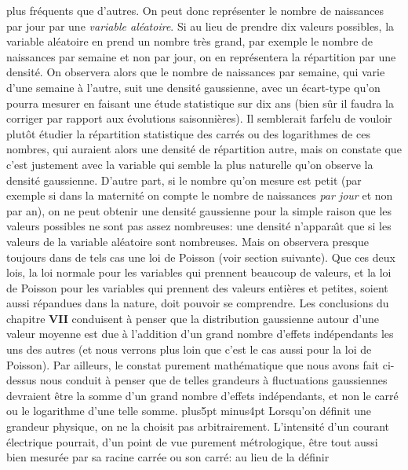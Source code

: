 plus fr\'equents que d'autres.  On peut donc repr\'esenter le nombre de 
naissances par jour par une {\it variable al\'eatoire}.  Si au lieu de 
prendre dix valeurs possibles,  la variable al\'eatoire en prend un 
nombre tr\`es grand,  par exemple le nombre de naissances par semaine  
et non par jour,  on en repr\'esentera la r\'epartition par une densit\'e.  
On observera alors que le nombre de naissances par semaine,  qui varie 
d'une semaine \`a l'autre,  suit une densit\'e gaussienne,  avec un 
\'ecart-type qu'on pourra mesurer en faisant une \'etude statistique sur 
dix ans (bien s\^ur il faudra la corriger par rapport aux \'evolutions 
saisonni\`eres).  Il semblerait farfelu de vouloir plut\^ot \'etudier
la r\'epartition statistique des carr\'es ou des logarithmes de 
ces nombres,  qui auraient alors une densit\'e de r\'epartition autre,  
mais on constate que c'est justement avec la variable qui semble la  
plus naturelle qu'on observe la densit\'e gaussienne.   
\medskip 
D'autre part,  si le nombre qu'on mesure est petit (par exemple si dans la  
maternit\'e on compte le nombre de naissances {\it par jour} et non par  
an),  on ne peut obtenir une densit\'e gaussienne pour la simple raison
que les valeurs possibles ne sont pas assez nombreuses:  une densit\'e  
n'appara{\^\i}t que si les valeurs de la variable al\'eatoire sont  
nombreuses.  Mais on observera presque toujours dans de tels cas une loi  
de Poisson (voir section suivante).  Que ces deux lois,  la loi normale pour  
les variables qui prennent beaucoup de valeurs,  et la loi de Poisson pour  
les variables qui prennent des valeurs enti\`eres et petites,  soient aussi  
r\'epandues dans la nature,  doit pouvoir se comprendre. 
\medskip 
Les conclusions du chapitre {\bf VII} conduisent \`a penser que la 
distribution gaussienne autour d'une valeur moyenne est due \`a  
l'addition d'un grand nombre d'effets ind\'ependants les uns des autres 
(et nous verrons plus loin que c'est le cas aussi pour la loi de Poisson).  
Par ailleurs,  le constat purement math\'ematique que nous avons fait 
ci-dessus nous conduit \`a penser que de telles grandeurs \`a fluctuations 
gaussiennes devraient \^etre la somme d'un grand nombre d'effets 
ind\'ependants,  et non le carr\'e ou le logarithme d'une telle somme.   
\vskip 6pt plus5pt minus4pt 
Lorsqu'on d\'efinit une grandeur physique,  on ne la choisit pas 
arbitrairement.  L'intensit\'e d'un courant \'electrique pourrait,  
d'un point de vue purement m\'etrologique,  \^etre tout aussi bien  
mesur\'ee par sa racine carr\'ee ou son carr\'e: au lieu de la d\'efinir 
